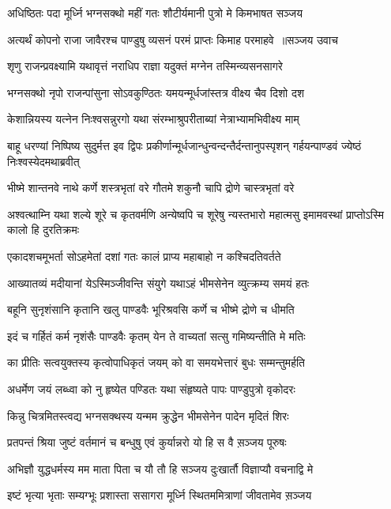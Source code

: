 \twolineshloka
{अधिष्ठितः पदा मूर्ध्नि भग्नसक्थो महीं गतः}
{शौटीर्यमानी पुत्रो मे किमभाषत सञ्जय}


\threelineshloka
{अत्यर्थं कोपनो राजा जावैरश्च पाण्डुषु}
{व्यसनं परमं प्राप्तः किमाह परमाहवे ॥सञ्जय उवाच}
{}


\twolineshloka
{शृणु राजन्प्रवक्ष्यामि यथावृत्तं नराधिप}
{राज्ञा यदुक्तं मग्नेन तस्मिन्व्यसनसागरे}


\twolineshloka
{भग्नसक्थो नृपो राजन्पांसुना सोऽवकुण्ठितः}
{यमयन्मूर्धजांस्तत्र वीक्ष्य चैव दिशो दश}


\twolineshloka
{केशान्नियस्य यत्नेन निःश्वसन्नुरगो यथा}
{संरम्भाश्रुपरीताब्यां नेत्राभ्यामभिवीक्ष्य माम्}


\threelineshloka
{बाहू धरण्यां निष्पिष्य सुदुर्मत्त इव द्विपः}
{प्रकीर्णान्मूर्धजान्धुन्वन्दन्तैर्दन्तानुपस्पृशन्}
{गर्हयन्पाण्डवं ज्येष्ठं निःश्वस्येदमथाब्रवीत्}


\twolineshloka
{भीष्मे शान्तनवे नाथे कर्णे शस्त्रभृतां वरे}
{गौतमे शकुनौ चापि द्रोणे चास्त्रभृतां वरे}


\threelineshloka
{अश्वत्थाम्नि यथा शल्ये शूरे च कृतवर्मणि}
{अन्येष्वपि च शूरेषु न्यस्तभारो महात्मसु}
{इमामवस्थां प्राप्तोऽस्मि कालो हि दुरतिक्रमः}


\twolineshloka
{एकादशचमूभर्ता सोऽहमेतां दशां गतः}
{कालं प्राप्य महाबाहो न कश्चिदतिवर्तते}


\twolineshloka
{आख्यातव्यं मदीयानां येऽस्मिञ्जीवन्ति संयुगे}
{यथाऽहं भीमसेनेन व्युत्क्रम्य समयं हतः}


\twolineshloka
{बहूनि सुनृशंसानि कृतानि खलु पाण्डवैः}
{भूरिश्रवसि कर्णे च भीष्मे द्रोणे च धीमति}


\twolineshloka
{इदं च गर्हितं कर्म नृशंसैः पाण्डवैः कृतम्}
{येन ते वाच्यतां सत्सु गमिष्यन्तीति मे मतिः}


\twolineshloka
{का प्रीतिः सत्वयुक्तस्य कृत्वोपाधिकृतं जयम्}
{को वा समयभेत्तारं बुधः सम्मन्तुमर्हति}


\twolineshloka
{अधर्मेण जयं लब्ध्वा को नु हृष्येत पण्डितः}
{यथा संहृष्यते पापः पाण्डुपुत्रो वृकोदरः}


\twolineshloka
{किन्नु चित्रमितस्त्वद्य भग्नसक्थस्य यन्मम}
{क्रुद्धेन भीमसेनेन पादेन मृदितं शिरः}


\twolineshloka
{प्रतपन्तं श्रिया जुष्टं वर्तमानं च बन्धुषु}
{एवं कुर्यान्नरो यो हि स वै स़ञ्जय पूरुषः}


\twolineshloka
{अभिज्ञौ युद्धधर्मस्य मम माता पिता च यौ}
{तौ हि सञ्जय दुःखार्तौ विज्ञाप्यौ वचनाद्वि मे}


\twolineshloka
{इष्टं भृत्या भृताः सम्यग्भूः प्रशास्ता ससागरा}
{मूर्ध्नि स्थितममित्राणां जीवतामेव स़ञ्जय}



